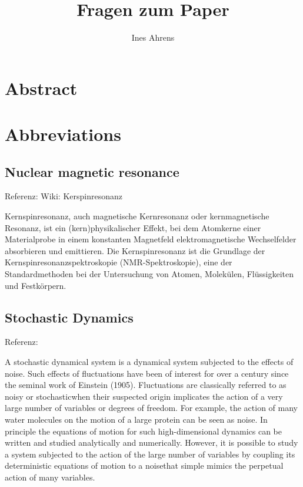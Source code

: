 \documentclass[]{article}
\title{Fragen zum Paper}
\author{Ines Ahrens}
\begin{document}
\maketitle

\section{Abstract}

\section{Abbreviations}

\subsection[NMR]{Nuclear magnetic resonance}
Referenz: Wiki: Kerspinresonanz

Kernspinresonanz, auch magnetische Kernresonanz oder kernmagnetische Resonanz, ist ein (kern)physikalischer Effekt, bei dem Atomkerne einer Materialprobe in einem konstanten Magnetfeld elektromagnetische Wechselfelder absorbieren und emittieren. Die Kernspinresonanz ist die Grundlage der Kernspinresonanzspektroskopie (NMR-Spektroskopie), eine der Standardmethoden bei der Untersuchung von Atomen, Molekülen, Flüssigkeiten und Festkörpern. 

\subsection*{Stochastic Dynamics}
Referenz: %

A stochastic dynamical system is a dynamical system subjected to the effects of noise. Such effects of fluctuations have been of interest for over a century since the seminal work of Einstein (1905). Fluctuations are classically referred to as \glqq noisy \grqq or \glqq stochastic\grqq  when their suspected origin implicates the action of a very large number of variables or \glqq degrees of freedom\grqq. For example, the action of many water molecules on the motion of a large protein can be seen as noise. In principle the equations of motion for such high-dimensional dynamics can be written and studied analytically and numerically. However, it is possible to study a system subjected to the action of the large number of variables by coupling its deterministic equations of motion to a \glqq noise\grqq  that simple mimics the perpetual action of many variables. 
\end{document}
